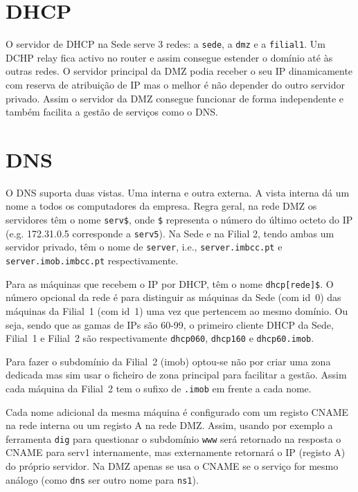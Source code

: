 \documentclass[12pt,a4paper]{report}
\begin{document}
\section{DHCP}

O servidor de DHCP na Sede serve 3 redes: a \texttt{sede}, a \texttt{dmz} e a \texttt{filial1}. Um DCHP relay fica activo no router e assim consegue estender o domínio até às outras redes. O servidor principal da DMZ podia receber o seu IP dinamicamente com reserva de atribuição de IP mas o melhor é não depender do outro servidor privado. Assim o servidor da DMZ consegue funcionar de forma independente e também facilita a gestão de serviços como o DNS.

\section{DNS}

O DNS suporta duas vistas. Uma interna e outra externa. A vista interna dá um nome a todos os computadores da empresa. Regra geral, na rede DMZ os servidores têm o nome \verb+serv$+, onde \verb+$+ representa o número do último octeto do IP (e.g. 172.31.0.5 corresponde a \texttt{serv5}). Na Sede e na Filial 2, tendo ambas um servidor privado, têm o nome de \texttt{server}, i.e., \texttt{server.imbcc.pt} e \texttt{server.imob.imbcc.pt} respectivamente.

Para as máquinas que recebem o IP por DHCP, têm o nome \verb+dhcp[rede]$+. O número opcional da rede é para distinguir as máquinas da Sede (com id~0) das máquinas da Filial~1 (com id~1) uma vez que pertencem ao mesmo domínio. Ou seja, sendo que as gamas de IPs são 60-99, o primeiro cliente DHCP da Sede, Filial~1 e Filial~2 são respectivamente \texttt{dhcp060}, \texttt{dhcp160} e \texttt{dhcp60.imob}.

Para fazer o subdomínio da Filial~2 (imob) optou-se não por criar uma zona dedicada mas sim usar o ficheiro de zona principal para facilitar a gestão. Assim cada máquina da Filial~2 tem o sufixo de \texttt{.imob} em frente a cada nome.

Cada nome adicional da mesma máquina é configurado com um registo CNAME na rede interna ou um registo A na rede DMZ. Assim, usando por exemplo a ferramenta \texttt{dig} para questionar o subdomínio \texttt{www} será retornado na resposta o CNAME para serv1 internamente, mas externamente retornará o IP (registo A) do próprio servidor. Na DMZ apenas se usa o CNAME se o serviço for mesmo análogo (como \texttt{dns} ser outro nome para \texttt{ns1}).
\end{document}
